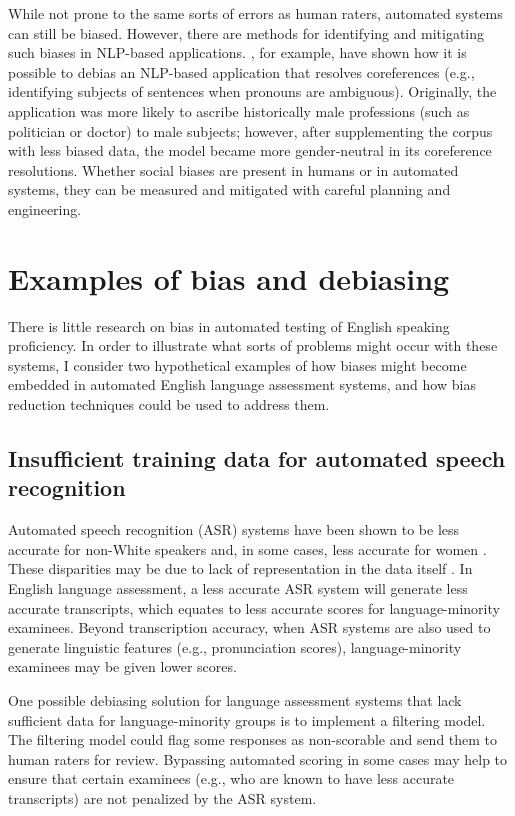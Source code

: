 \documentclass [PhD] {uclathes}
\begin{document}
While not prone to the same sorts of errors as human raters, automated systems can still be biased. However, there are methods for identifying and mitigating such biases in NLP-based applications. \citet{zhao2018gender}, for example, have shown how it is possible to debias an NLP-based application that resolves coreferences (e.g., identifying subjects of sentences when pronouns are ambiguous). Originally, the application was more likely to ascribe historically male professions (such as politician or doctor) to male subjects; however, after supplementing the corpus with less biased data, the model became more gender-neutral in its coreference resolutions. Whether social biases are present in humans or in automated systems, they can be measured and mitigated with careful planning and engineering.

\section{Examples of bias and debiasing}

There is little research on bias in automated testing of English speaking proficiency. In order to illustrate what sorts of problems might occur with these systems, I consider two hypothetical examples of how biases might become embedded in automated English language assessment systems, and how bias reduction techniques could be used to address them.

\subsection{Insufficient training data for automated speech recognition}

Automated speech recognition (ASR) systems have been shown to be less accurate for non-White speakers \citep{koenecke2020} and, in some cases, less accurate for women \citep{tatman2017a, tatman2017b}. These disparities may be due to lack of representation in the data itself \citep[e.g.][]{zhao2018gender}. In English language assessment, a less accurate ASR system will generate less accurate transcripts, which equates to less accurate scores for language-minority examinees. Beyond transcription accuracy, when ASR systems are also used to generate linguistic features (e.g., pronunciation scores), language-minority examinees may be given lower scores.

One possible debiasing solution for language assessment systems that lack sufficient data for language-minority groups is to implement a filtering model. The filtering model could flag some responses as non-scorable and send them to human raters for review. Bypassing automated scoring in some cases may help to ensure that certain examinees (e.g., who are known to have less accurate transcripts) are not penalized by the ASR system.
\end{document}
